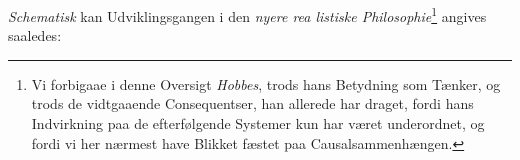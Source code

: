 \emph{Schematisk} kan Udviklingsgangen i den \emph{nyere rea\-%
listiske Philosophie}\footnote{Vi forbigaae i denne Oversigt \emph{Hobbes}, trods hans Betydning som
Tænker, og trods de vidtgaaende Consequentser, han allerede har
draget, fordi hans Indvirkning paa de efterfølgende Systemer kun
har været underordnet, og fordi vi her nærmest have Blikket fæstet
paa Causalsammenhængen.} angives saaledes:
%
%
%
%
